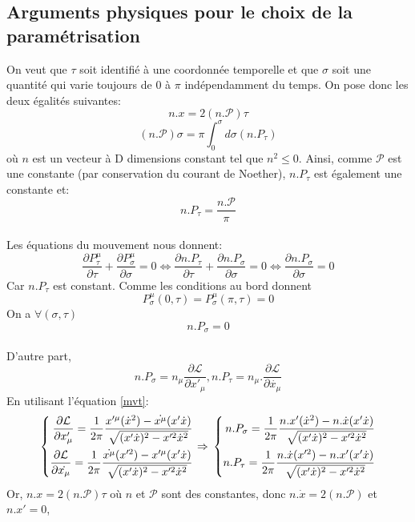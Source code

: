 \documentclass[a4paper,12pt]{article}
\def\xmu{x^\mu}
\def\CP{\mathcal{P}}
\def\CL{\mathcal{L}}
\begin{document}
\subsection{Arguments physiques pour le choix de la paramétrisation}
On veut que $\tau$ soit identifié à une coordonnée temporelle et que $\sigma$ soit une quantité qui varie toujours de $0$ à $\pi$ indépendamment du temps.
On pose donc les deux égalités suivantes:
$$n.x=2(n.\mathcal{P})\tau$$
$$(n.\mathcal{P})\sigma=\pi\int_0^\sigma d\sigma (n.P_\tau)$$
où $n$ est un vecteur à D dimensions constant tel que $n^2\leq0$.
Ainsi, comme $\CP$ est une constante (par conservation du courant de Noether), 
$n.P_\tau$ est également une constante et:
$$n.P_\tau=\frac{n.\mathcal{P}}{\pi}$$\\
Les équations du mouvement nous donnent:
$$\frac{\partial P^{\mu}_{\tau}}{\partial \tau}+\frac{\partial P^{\mu}_{\sigma}}{\partial \sigma}=0 \Leftrightarrow \frac{\partial n.P_{\tau}}{\partial \tau}+\frac{\partial n.P_{\sigma}}{\partial \sigma}=0 \Leftrightarrow \frac{\partial n.P_{\sigma}}{\partial \sigma}=0$$
Car $n.P_\tau$ est constant.
Comme les conditions au bord donnent
$$P_\sigma^\mu(0,\tau)=P_\sigma^\mu(\pi,\tau)=0$$
On a $\forall (\sigma,\tau)$ $$n.P_\sigma=0 $$\\
D'autre part, 
$$n.P_\sigma=n_\mu \frac{\partial \CL}{\partial x'_\mu }, n.P_\tau=n_\mu.\frac{\partial \CL}{\partial \dot{x_\mu}}$$
En utilisant l'équation \eqref{mvt}:
\begin{equation*}
	\left\lbrace
	\begin{aligned}
	\frac{\partial \CL}{\partial x'_\mu }=\frac{1}{2\pi}\frac{x'^\mu (\dot{x}^2)-\dot{\xmu}(x'\dot{x})}{\sqrt{(x'\dot{x})^2-x'^2\dot{x}^2}}\\
	\frac{\partial \CL}{\partial \dot{x_\mu}}=\frac{1}{2\pi}\frac{\dot{\xmu} (x'^2)-x'^\mu(x'\dot{x})}{\sqrt{(x'\dot{x})^2-x'^2\dot{x}^2}}\\
	\end{aligned}
	\right.
	\Rightarrow\\
	\left\lbrace
	\begin{aligned}
	n.P_\sigma=\frac{1}{2\pi}\frac{n.x' (\dot{x}^2)-n.\dot{x}(x'\dot{x})}{\sqrt{(x'\dot{x})^2-x'^2\dot{x}^2}}\\
	n.P_\tau=\frac{1}{2\pi}\frac{n.\dot{x} (x'^2)-n.x'(x'\dot{x})}{\sqrt{(x'\dot{x})^2-x'^2\dot{x}^2}}
	\end{aligned}
	\right.
\end{equation*}
Or, $n.x=2(n.\mathcal{P})\tau$ où $n$ et $\mathcal{P}$ sont des constantes,
donc $n.\dot{x}=2(n.\mathcal{P})$ et $n.x'=0$,
\end{document}
